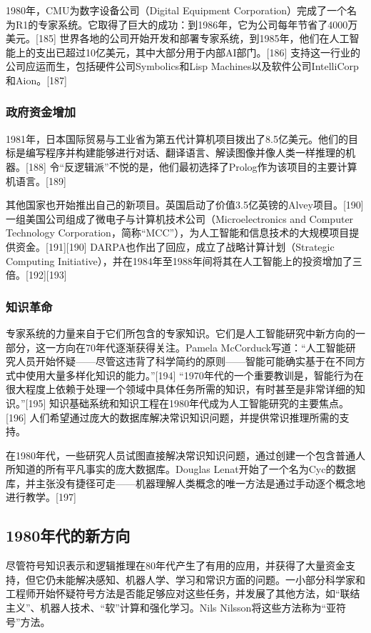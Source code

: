 1980年，CMU为数字设备公司（Digital Equipment Corporation）完成了一个名为R1的专家系统。它取得了巨大的成功：到1986年，它为公司每年节省了4000万美元。[185] 世界各地的公司开始开发和部署专家系统，到1985年，他们在人工智能上的支出已超过10亿美元，其中大部分用于内部AI部门。[186] 支持这一行业的公司应运而生，包括硬件公司Symbolics和Lisp Machines以及软件公司IntelliCorp和Aion。[187]
\subsubsection{政府资金增加}
1981年，日本国际贸易与工业省为第五代计算机项目拨出了8.5亿美元。他们的目标是编写程序并构建能够进行对话、翻译语言、解读图像并像人类一样推理的机器。[188] 令“反逻辑派”不悦的是，他们最初选择了Prolog作为该项目的主要计算机语言。[189]

其他国家也开始推出自己的新项目。英国启动了价值3.5亿英镑的Alvey项目。[190] 一组美国公司组成了微电子与计算机技术公司（Microelectronics and Computer Technology Corporation，简称“MCC”），为人工智能和信息技术的大规模项目提供资金。[191][190] DARPA也作出了回应，成立了战略计算计划（Strategic Computing Initiative），并在1984年至1988年间将其在人工智能上的投资增加了三倍。[192][193]
\subsubsection{知识革命}
专家系统的力量来自于它们所包含的专家知识。它们是人工智能研究中新方向的一部分，这一方向在70年代逐渐获得关注。Pamela McCorduck写道：“人工智能研究人员开始怀疑——尽管这违背了科学简约的原则——智能可能确实基于在不同方式中使用大量多样化知识的能力。”[194] “1970年代的一个重要教训是，智能行为在很大程度上依赖于处理一个领域中具体任务所需的知识，有时甚至是非常详细的知识。”[195] 知识基础系统和知识工程在1980年代成为人工智能研究的主要焦点。[196] 人们希望通过庞大的数据库解决常识知识问题，并提供常识推理所需的支持。

在1980年代，一些研究人员试图直接解决常识知识问题，通过创建一个包含普通人所知道的所有平凡事实的庞大数据库。Douglas Lenat开始了一个名为Cyc的数据库，并主张没有捷径可走——机器理解人类概念的唯一方法是通过手动逐个概念地进行教学。[197]
\subsection{1980年代的新方向}
尽管符号知识表示和逻辑推理在80年代产生了有用的应用，并获得了大量资金支持，但它仍未能解决感知、机器人学、学习和常识方面的问题。一小部分科学家和工程师开始怀疑符号方法是否能足够应对这些任务，并发展了其他方法，如“联结主义”、机器人技术、“软”计算和强化学习。Nils Nilsson将这些方法称为“亚符号”方法。
